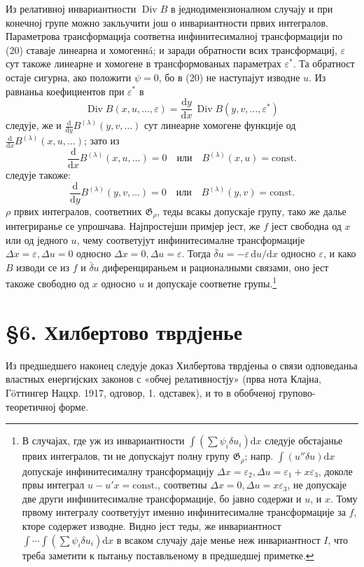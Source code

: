 ﻿\documentclass[11pt]{article}
\providecommand{\G}{\mathfrak G}
\providecommand{\eps}{\varepsilon}
\providecommand{\D}{\Delta}
\providecommand{\dd}{\mathrm d}
\DeclareMathOperator{\Div}{Div}
\providecommand{\bd}{\bar{\delta}}
\begin{document}
Из релативној инвариантности \(\Div B\) в једнодимензионалном случају и при конечној групе можно закльучити још о инвариантности првих интегралов. Параметрова трансформација соответна инфинитесималној трансформацији по (20) ставаје линеарна и хомогеннá; и заради обратности всих трансформациј, \(\eps\) сут такоже линеарне и хомогене в трансформованых параметрах \(\eps^*\). Та обратност остаје сигурна, ако положити \(\psi=0\), бо в (20) не наступајут изводне \(u\). Из равнаньа коефициентов при \(\eps^*\) в
\[
\Div B(x,u,\ldots,\eps)=\frac{\dd y}{\dd x}\,\Div B(y,v,\ldots,\eps^*)
\]
следује, же и \(\frac{\dd}{\dd y}B^{(\lambda)}(y,v,\ldots)\) сут линеарне хомогене функције од \(\frac{\dd}{\dd x}B^{(\lambda)}(x,u,\ldots)\); зато из
\[
\frac{\dd}{\dd x}B^{(\lambda)}(x,u,\ldots)=0
\quad\text{или}\quad B^{(\lambda)}(x,u)=\mathrm{const.}
\]
следује такоже:
\[
\frac{\dd}{\dd y}B^{(\lambda)}(y,v,\ldots)=0
\quad\text{или}\quad B^{(\lambda)}(y,v)=\mathrm{const.}
\]
\(\rho\) првих интегралов, соответних \(\G_\rho\), теды всакы допускаје групу, тако же далье интегриранье се упрошчава. Најпростејши примјер јест, же \(f\) јест свободна од \(x\) или од једного \(u\), чему соответујут инфинитесималне трансформације \(\D x=\eps,\D u=0\) односно \(\D x=0,\D u=\eps\). Тогда \(\bd u=-\eps\,\dd u/\dd x\) односно \(\eps\), и како \(B\) изводи се из \(f\) и \(\bd u\) диференцираньем и рационалными связами, оно јест такоже свободно од \(x\) односно \(u\) и допускаје соответне групы.\footnote{В случајах, где уж из инвариантности \(\int(\sum\psi_i\delta u_i)\dd x\) следује обстајанье првих интегралов, ти не допускајут полну групу \(\G_\rho\); напр. \(\int(u''\delta u)\dd x\) допускаје инфинитесималну трансформацију \(\D x=\eps_2,\D u=\eps_1+x\eps_3\), доколе првы интеграл \(u-u'x=\mathrm{const.}\), соответны \(\D x=0,\D u=x\eps_3\), не допускаје две други инфинитесималне трансформације, бо јавно содержи и \(u\), и \(x\). Тому првому интегралу соответујут именно инфинитесималне трансформације за \(f\), кторе содержет изводне. Видно јест теды, же инвариантност \(\int\!\cdots\!\int(\sum\psi_i\delta u_i)\dd x\) в всаком случају даје менье неж инвариантност \(I\), что треба заметити к пытаньу поставльеному в предшедшеј приметке.}

\section*{\S{}6. Хилбертово тврдјенье}

Из предшедшего наконец следује доказ Хилбертова тврдјеньа о связи одповеданьа властных енергијских законов с «обчеј релативностју» (прва нота Клајна, Гöттингер Нацхр. 1917, одговор, 1. одставек), и то в обобченој групово-теоретичној форме.
\end{document}
